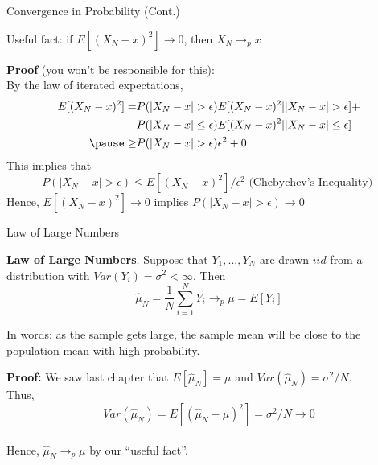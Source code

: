\documentclass[11pt,english,handout]{beamer}
\newenvironment{wideitemize}{\itemize\addtolength{\itemsep}{10pt}}{\enditemize}
\begin{document}
\begin{frame}{Convergence in Probability (Cont.)}
	
\begin{wideitemize}

\item Useful fact: if $E[ (X_N - x)^2 ] \rightarrow 0$, then $X_N \rightarrow_p x$

\pause

\item 
\textbf{Proof} (you won't be responsible for this): \\

By the law of iterated expectations, 
\begin{align*}
E[ (X_N - x)^2 ]=& P( |X_N - x| > \epsilon ) E[ (X_N - x)^2 | |X_N - x| > \epsilon ] + \\
& P( |X_N - x| \leq \epsilon ) E[ (X_N - x)^2 | |X_N - x| \leq \epsilon ]	 \\
\pause \geq &  P( |X_N - x| > \epsilon ) \epsilon^2 + 0 
\end{align*}
\pause
\noindent This implies that 
$$P( |X_N - x|  > \epsilon ) \leq E[ (X_N - x)^2  ] / \epsilon^2 \text{ (Chebychev's Inequality)  }$$
\pause 
Hence, $E[ (X_N - x)^2  ] \rightarrow 0$ implies $P( |X_N - x|  > \epsilon ) \rightarrow 0$

\end{wideitemize}	
\end{frame}


\begin{frame}{Law of Large Numbers}
	
\begin{wideitemize}
	
\item \textbf{Law of Large Numbers}. Suppose that $Y_1,...,Y_N$ are drawn $iid$ from a distribution with $Var(Y_i) = \sigma^2 < \infty$. Then $$\hat\mu_N = \frac{1}{N} \sum_{i=1}^{N} Y_i \rightarrow_p \mu = E[Y_i]$$

\item
In words: as the sample gets large, the sample mean will be close to the population mean with high probability.

\pause
\item
\textbf{Proof:} We saw last chapter that $E[\hat\mu_N] = \mu$ and $Var(\hat\mu_N) = \sigma^2 / N$.  \\

Thus, $$Var(\hat\mu_N) = E[ (\hat\mu_N - \mu )^2 ] = \sigma^2/N \rightarrow 0 $$ \\

Hence, $\hat\mu_N \rightarrow_p \mu$ by our ``useful fact''. 
\end{wideitemize}	
	
\end{frame}
\end{document}
